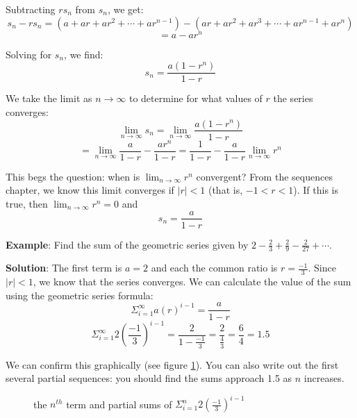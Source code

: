 Subtracting $rs_n$ from $s_n$, we get:
$$s_n - rs_n = (a + ar + ar^2 + \cdots + ar^{n-1}) - (ar + ar^2 + 
ar^3 + \cdots + ar^{n-1} + ar^n)$$
$$= a - ar^n$$



Solving for $s_n$, we find:
$$s_n = \frac{a(1-r^n)}{1-r}$$

We take the limit as $n \to \infty$ to determine for what values of 
$r$ the series converges:
$$\lim_{n \to \infty} s_n = \lim_{n \to \infty} \frac{a(1-r^n)}{1-r}$$
$$= \lim_{n\to \infty} \frac{a}{1-r} - \frac{ar^n}{1-r} = \frac{1}{1-r} 
- \frac{a}{1-r}\lim_{n \to \infty} r^n$$

This begs the question: when is $\lim_{n \to \infty} r^n$ convergent? 
From the sequences chapter, we know this limit converges if $|r| < 1$ 
(that is, $-1 < r < 1$). If this is true, then $\lim_{n \to \infty} 
r^n = 0$ and 
$$s_n = \frac{a}{1-r}$$



\textbf{Example}: Find the sum of the geometric series given by $2 - 
\frac{2}{3} + \frac{2}{9} - \frac{2}{27} + \cdots$. 

\textbf{Solution}: The first term is $a = 2$ and each the common 
ratio is $r = \frac{-1}{3}$. Since $|r| < 1$, we know that the series 
converges. We can calculate the value of the sum using the geometric 
series formula: 
$$\Sigma_{i=1}^\infty a(r)^{i-1} = \frac{a}{1-r}$$
$$\Sigma_{i=1}^\infty 2(\frac{-1}{3})^{i-1} = \frac{2}{1-\frac{-1}{3}} = 
\frac{2}{\frac{4}{3}} = \frac{6}{4} = 1.5$$

We can confirm this graphically (see figure \ref{fig:geometric}). You 
can also write out the first several partial sequences: you should 
find the sums approach 1.5 as $n$ increases.

\begin{figure}[htbp]
\centering
    \caption{the $n^{th}$ term and partial sums of $\Sigma_{i=1}^n 
    2(\frac{-1}{3})^{i-1}$}
    \label{fig:geometric}
\end{figure}

